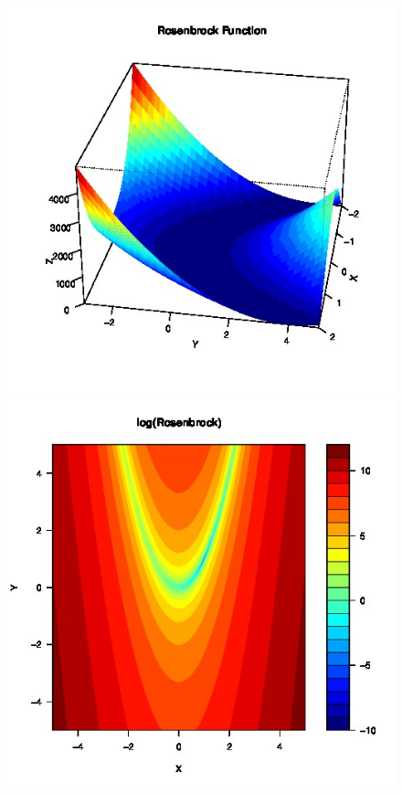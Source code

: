 \documentclass{article}
\begin{document}
\begin{figure}
	\begin{center}
		\begin{minipage}[h!]{0.49\textwidth}
			\includegraphics[width=1.0\textwidth]{rosePersp.jpg}
		\end{minipage}
		\begin{minipage}[h!]{0.49\textwidth}
			\includegraphics[width=1.0\textwidth]{roseContour.jpg}	
		\end{minipage}
	\end{center}
\end{figure}
\end{document}
